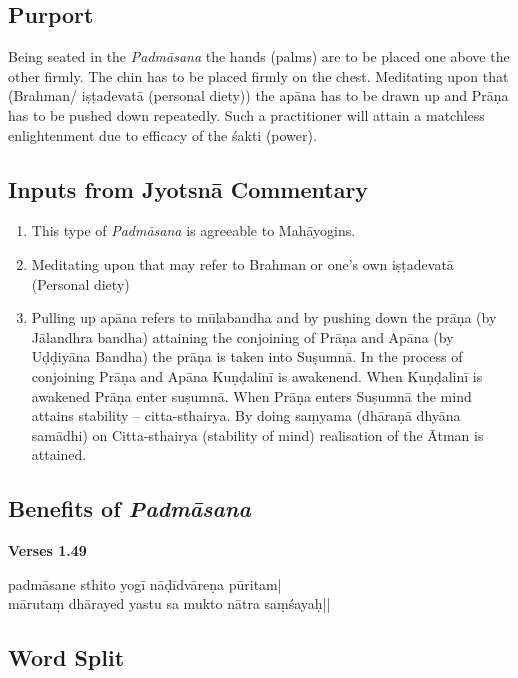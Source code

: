 \subsection*{Purport}

Being seated in the \textit{Padmāsana} the hands (palms) are to be placed one above the other firmly. The chin has to be placed firmly on the chest. Meditating upon that (Brahman/ iṣṭadevatā (personal diety)) the apāna has to be drawn up and Prāṇa has to be pushed down repeatedly. Such a practitioner will attain a matchless enlightenment due to efficacy of the śakti (power).

\subsection*{Inputs from Jyotsnā Commentary}


\begin{enumerate}
\item This type of \textit{Padmāsana} is agreeable to Mahāyogins. 
\item Meditating upon that may refer to Brahman or one’s own iṣṭadevatā (Personal diety)
\item Pulling up apāna refers to mūlabandha and by pushing down the prāṇa (by Jālandhra bandha) attaining the conjoining of Prāṇa and Apāna (by Uḍḍiyāna Bandha) the prāṇa is taken into Suṣumnā. In the process of conjoining Prāṇa and Apāna Kuṇḍalinī is awakenend. When Kuṇḍalinī is awakened Prāṇa enter suṣumnā. When Prāṇa enters Suṣumnā the mind attains stability – citta-sthairya. By doing saṃyama (dhāraṇā dhyāna samādhi) on Citta-sthairya (stability of mind) realisation of the Ātman is attained.
\end{enumerate}

\subsection*{Benefits of \textit{Padmāsana}}


\noindent \textbf{Verses 1.49}

\begin{shloka}
padmāsane sthito yogī nāḍīdvāreṇa pūritam|\\
mārutaṃ dhārayed yastu sa mukto nātra saṃśayaḥ||
\end{shloka}

\subsection*{Word Split}


